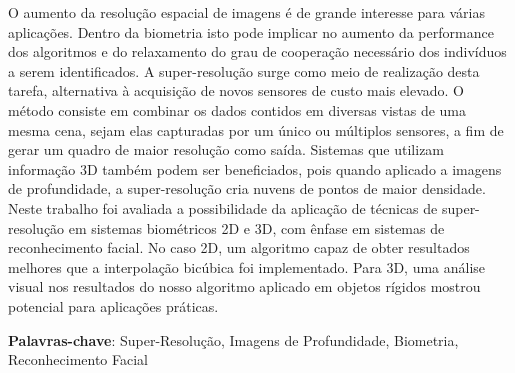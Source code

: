 O aumento da resolução espacial de imagens é de grande interesse para várias
aplicações. Dentro da biometria isto pode implicar no aumento da performance
dos algoritmos e do relaxamento do grau de cooperação necessário dos indivíduos
a serem identificados. A super-resolução surge como meio de realização desta
tarefa, alternativa à acquisição de novos sensores de custo mais elevado. O
método consiste em combinar os dados contidos em diversas vistas de uma mesma
cena, sejam elas capturadas por um único ou múltiplos sensores, a fim de gerar
um quadro de maior resolução como saída. Sistemas que utilizam informação 3D
também podem ser beneficiados, pois quando aplicado a imagens de profundidade,
a super-resolução cria nuvens de pontos de maior densidade. Neste trabalho foi
avaliada a possibilidade da aplicação de técnicas de super-resolução em
sistemas biométricos 2D e 3D, com ênfase em sistemas de reconhecimento facial.
No caso 2D, um algoritmo capaz de obter resultados melhores que a interpolação
bicúbica foi implementado. Para 3D, uma análise visual nos resultados do nosso
algoritmo aplicado em objetos rígidos mostrou potencial para aplicações
práticas.

\noindent \textbf{Palavras-chave}: Super-Resolução, Imagens de Profundidade,
Biometria, Reconhecimento Facial
